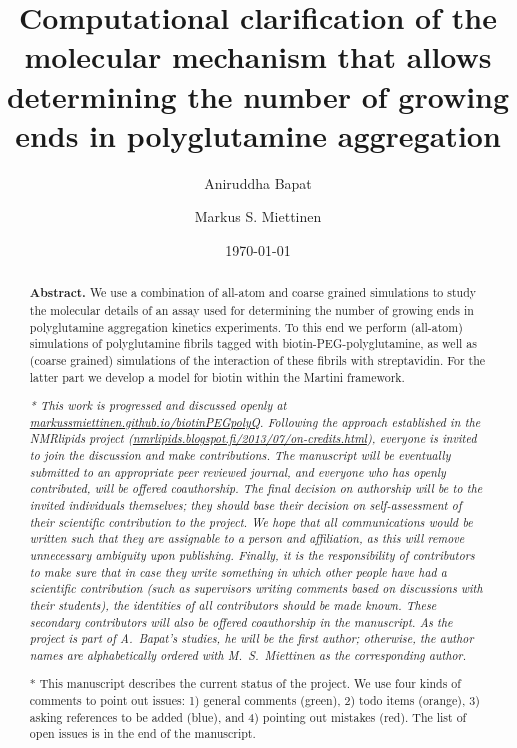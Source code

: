 \documentclass[a4paper,11pt,floatfix,authordate1-4,twocolumn]{revtex4-1}
\newcommand{\comment}[1]
{\todo[color=green!40]{\sffamily #1}} %
\newcommand{\reference}[1]
{\todo[color=blue!40]{\sffamily #1}} %
\newcommand{\wrong}[1]
{\todo[color=red!70]{\sffamily #1}} %
\begin{document}
\title{Computational clarification of the molecular mechanism that allows\\
 determining the number of growing ends in polyglutamine aggregation}

\author{Aniruddha Bapat}
\author{Markus S. Miettinen}

\date{\today}

\begin{abstract}
{\bf Abstract.}
We use a combination of all-atom and coarse grained simulations
to study the molecular details of an assay used for
determining the number of growing ends in polyglutamine
aggregation kinetics experiments.
%
To this end we perform (all-atom) simulations of
polyglutamine fibrils tagged with biotin-PEG-polyglutamine,
as well as (coarse grained) simulations of
the interaction of these fibrils with streptavidin.
%
For the latter part we develop a model for biotin
within the Martini framework.


\vspace{14pt}
{\it
* This work is progressed and discussed openly at \url{markussmiettinen.github.io/biotinPEGpolyQ}.
Following the approach established in the NMRlipids project
(\url{nmrlipids.blogspot.fi/2013/07/on-credits.html}),
everyone is invited to join the discussion and make contributions.
The manuscript will be eventually submitted to an appropriate peer reviewed journal, and
everyone who has openly contributed, will be offered coauthorship.
The final decision on authorship will be to the invited individuals themselves;
they should base their decision on self-assessment of their scientific contribution to the project.
%
We hope that all communications would be written such that they are assignable
to a person and affiliation, as this will remove unnecessary ambiguity upon publishing.
%
Finally, it is the responsibility of contributors to make sure that in case they write something in which other people have had a scientific contribution (such as supervisors writing comments based on discussions with their students), the identities of all contributors should be made known. These secondary contributors will also be offered coauthorship in the manuscript.
%
As the project is part of A.~Bapat's studies, he will be the first author;
otherwise, the author names are alphabetically ordered with M.~S.~Miettinen as the corresponding author.

* This manuscript describes the current status of the project.
%
We use four kinds of comments to point out issues:
1) general comments \comment{\textbackslash comment} (green),
2) todo items  (orange),
3) asking references to be added \reference{\textbackslash reference} (blue), and
4) pointing out mistakes \wrong{\textbackslash wrong} (red).
%
The list of open issues is in the end of the manuscript.
}
\end{abstract}
\end{document}
